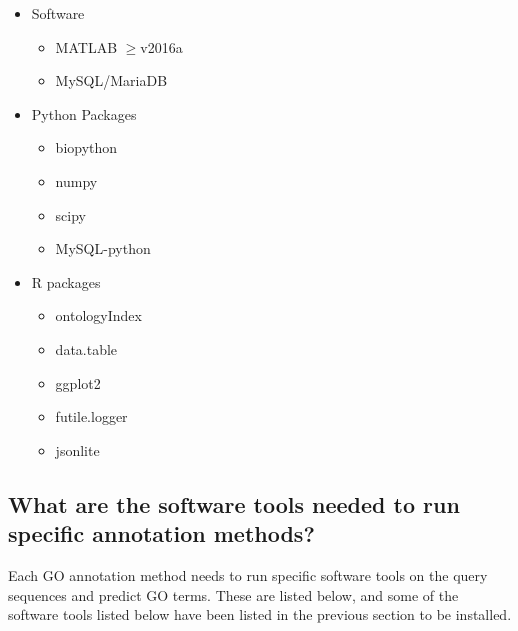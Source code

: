 \begin{itemize}
\begin{itemize}
     \item Software
     \begin{itemize}
       \item MATLAB $\geq$v2016a
       \item MySQL/MariaDB
     \end{itemize}
    
     \item Python Packages
     \begin{itemize}
      \item biopython
      \item numpy
      \item scipy
      \item MySQL-python
     \end{itemize}
    
     \item R packages
     \begin{itemize}
      \item ontologyIndex
      \item data.table
      \item ggplot2
      \item futile.logger
      \item jsonlite
     \end{itemize}
\end{itemize}
\end{itemize}


\subsection{What are the software tools needed to run specific annotation methods?}

Each GO annotation method needs to run specific software tools on the query sequences and predict GO terms. These are listed below, and some of the software tools listed below have been listed in the previous section to be installed.


